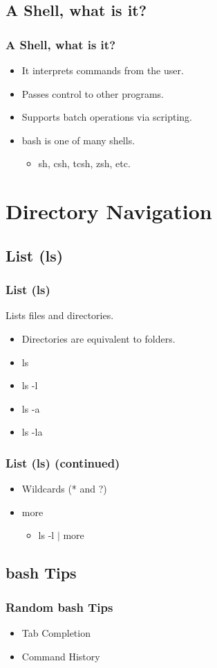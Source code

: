 \documentclass[hyperref={pdfpagelabels=false}]{beamer}
\begin{document}
\subsection{A Shell, what is it?}
\frame
{
    \frametitle{A Shell, what is it?}
    \begin{itemize}
    \item{It interprets commands from the user.}
    \item{Passes control to other programs.}
    \item{Supports batch operations via scripting.}
    \item{bash is one of many shells.}
        \begin{itemize}
        \item{sh, csh, tcsh, zsh, etc.}
        \end{itemize}
    \end{itemize}
}
\section{Directory Navigation}
\subsection{List (ls)}
\frame
{
    \frametitle{List (ls)}
    Lists files and directories.
    \begin{itemize}
    \item{Directories are equivalent to folders.}
    \end{itemize}
    \begin{itemize}
    \item{ls}
    \item{ls -l}
    \item{ls -a}
    \item{ls -la}
    \end{itemize}
}
\frame
{
    \frametitle{List (ls) (continued)}
    \begin{itemize}
    \item{Wildcards (* and ?)}
    \item{more}
        \begin{itemize}    
        \item{ls -l $\mid$ more}
        \end{itemize}
    \end{itemize}
}
\subsection{bash Tips}	
\frame
{
    \frametitle{Random bash Tips}
    \begin{itemize}
    \item{Tab Completion}
    \item{Command History}
    \end{itemize}
}
\end{document}
